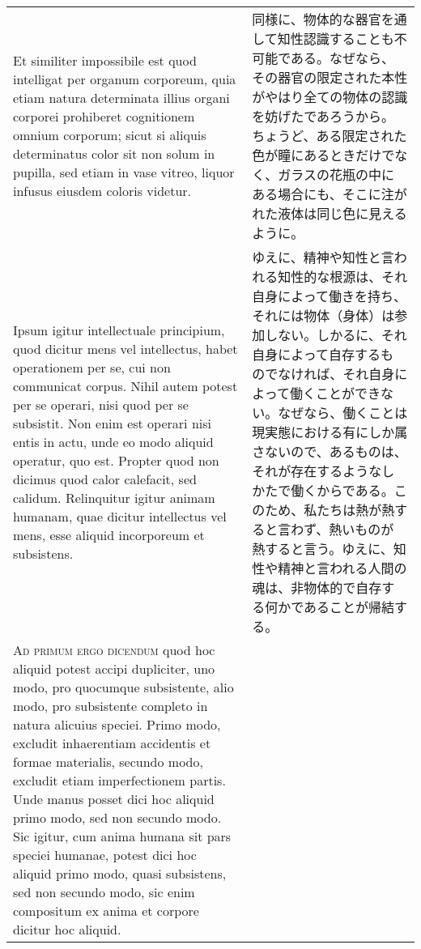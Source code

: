 \documentclass[paper=a4paper,fontsize=10pt,jafontsize=9pt,titlepage]{jlreq}
\begin{document}
\begin{longtable}{p{21em}p{21em}}
\\


Et similiter impossibile est quod
intelligat per organum corporeum, quia etiam natura determinata illius
organi corporei prohiberet cognitionem omnium corporum; sicut si
aliquis determinatus color sit non solum in pupilla, sed etiam in vase
vitreo, liquor infusus eiusdem coloris videtur. 


&

同様に、物体的な器官を通して知性認識することも不可能である。なぜなら、
その器官の限定された本性がやはり全ての物体の認識を妨げたであろうから。
ちょうど、ある限定された色が瞳にあるときだけでなく、ガラスの花瓶の中に
ある場合にも、そこに注がれた液体は同じ色に見えるように。


\\

Ipsum igitur intellectuale principium, quod dicitur mens vel
intellectus, habet operationem per se, cui non communicat
corpus. Nihil autem potest per se operari, nisi quod per se
subsistit. Non enim est operari nisi entis in actu, unde eo modo
aliquid operatur, quo est. Propter quod non dicimus quod calor
calefacit, sed calidum. Relinquitur igitur animam humanam, quae
dicitur intellectus vel mens, esse aliquid incorporeum et subsistens.


&

ゆえに、精神や知性と言われる知性的な根源は、それ自身によって働きを持ち、
それには物体（身体）は参加しない。しかるに、それ自身によって自存するも
のでなければ、それ自身によって働くことができない。なぜなら、働くことは
現実態における有にしか属さないので、あるものは、それが存在するようなし
かたで働くからである。このため、私たちは熱が熱すると言わず、熱いものが
熱すると言う。ゆえに、知性や精神と言われる人間の魂は、非物体的で自存す
る何かであることが帰結する。



\\


{\scshape Ad primum ergo dicendum} quod hoc aliquid potest accipi
dupliciter, uno modo, pro quocumque subsistente, alio modo, pro
subsistente completo in natura alicuius speciei. Primo modo, excludit
inhaerentiam accidentis et formae materialis, secundo modo, excludit
etiam imperfectionem partis. Unde manus posset dici hoc aliquid primo
modo, sed non secundo modo. Sic igitur, cum anima humana sit pars
speciei humanae, potest dici hoc aliquid primo modo, quasi subsistens,
sed non secundo modo, sic enim compositum ex anima et corpore dicitur
hoc aliquid.



\end{longtable}
\end{document}
